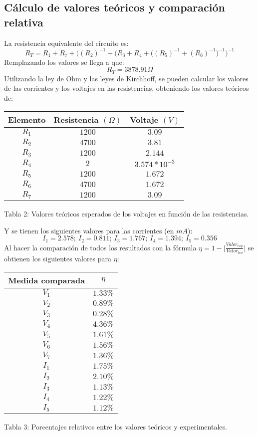 \documentclass{article}
\begin{document}
\subsection{C\'alculo de valores te\'oricos y comparaci\'on relativa}
La resistencia equivalente del circuito es:
$$R_T=R_1+R_7+\Big( (R_2)^{-1}+(R_3+R_4+\big( (R_5)^{-1} + (R_6)^{-1} \big)^{-1} \Big) ^{-1}$$
Remplazando los valores se llega a que:
$$R_T=3878.91\Omega$$
Utilizando la ley de Ohm y las leyes de Kirchhoff, se pueden calcular los valores de las corrientes y los voltajes en las resistencias, obteniendo los valores te\'oricos de:
\begin{center}
\begin{tabular}{||c|c|c||}
\hline
Elemento & Resistencia $(\Omega)$ & Voltaje $(V)$ \\ \hline
$R_1$ & $1200$ & $3.09$ \\ \hline
$R_2$ & $4700$ & $3.81$ \\ \hline
$R_3$ & $1200$ & $2.144$ \\ \hline
$R_4$ & $2$ & $3.574*10^{-3}$ \\ \hline
$R_5$ & $1200$ & $1.672$ \\ \hline
$R_6$ & $4700$ & $1.672$ \\ \hline
$R_7$ & $1200$ & $3.09$ \\ \hline
\end{tabular}
\end{center}
\begin{center}
Tabla 2: Valores te\'oricos esperados de los voltajes en funci\'on de las resistencias.
\end{center}
Y se tienen los siguientes valores para las corrientes (en $mA$):
$$I_1=2.578;\ I_2=0.811;\ I_3=1.767;\ I_4=1.394;\ I_5=0.356$$
Al hacer la comparaci\'on de todos los resultados con la f\'ormula $\eta=1-\Bigg|\frac{Valor_{exp}}{Valor_{teo}}\Bigg|$ se obtienen los siguientes valores para $\eta$:
\begin{center}
\begin{tabular}{||c|c||}
\hline
Medida comparada & $\eta$ \\ \hline
$	V_1	$	&$	1.33	\%$	\\ \hline
$	V_2	$	&$	0.89	\%$	\\ \hline
$	V_3	$	&$	0.28	\%$	\\ \hline
$	V_4	$	&$	4.36	\%$	\\ \hline
$	V_5	$	&$	1.61	\%$	\\ \hline
$	V_6	$	&$	1.56	\%$	\\ \hline
$	V_7	$	&$	1.36	\%$	\\ \hline
$	I_1	$	&$	1.75	\%$	\\ \hline
$	I_2	$	&$	2.10	\%$	\\ \hline
$	I_3	$	&$	1.13	\%$	\\ \hline
$	I_4	$	&$	1.22	\%$	\\ \hline
$	I_5	$	&$	1.12	\%$	\\ \hline

\end{tabular}
\end{center}
\begin{center}
Tabla 3: Porcentajes relativos entre los valores te\'oricos y experimentales.
\end{center}
\end{document}
